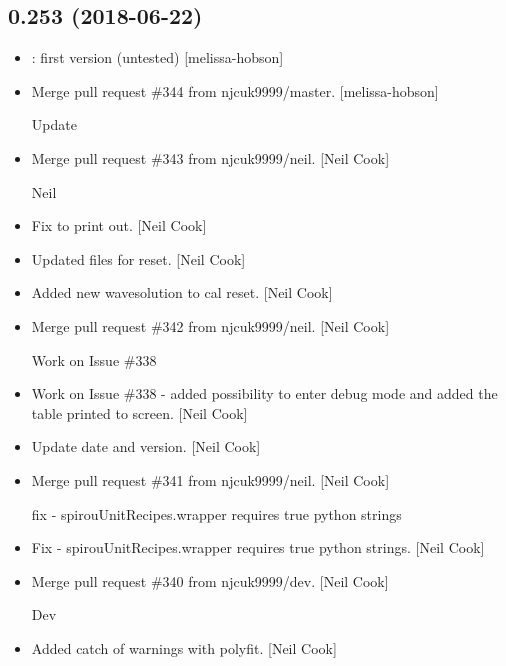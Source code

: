 \documentclass[a4paper,10pt,english]{report}
\begin{document}
\subsection{0.253 (2018-06-22)}
\label{\detokenize{misc/changelog:id413}}\begin{itemize}
\item {} 
: first version (untested) {[}melissa-hobson{]}

\item {} 
Merge pull request \#344 from njcuk9999/master. {[}melissa-hobson{]}

Update

\item {} 
Merge pull request \#343 from njcuk9999/neil. {[}Neil Cook{]}

Neil

\item {} 
Fix to print out. {[}Neil Cook{]}

\item {} 
Updated files for reset. {[}Neil Cook{]}

\item {} 
Added new wavesolution to cal reset. {[}Neil Cook{]}

\item {} 
Merge pull request \#342 from njcuk9999/neil. {[}Neil Cook{]}

Work on Issue \#338

\item {} 
Work on Issue \#338 - added possibility to enter debug mode and added
the table printed to screen. {[}Neil Cook{]}

\item {} 
Update date and version. {[}Neil Cook{]}

\item {} 
Merge pull request \#341 from njcuk9999/neil. {[}Neil Cook{]}

fix - spirouUnitRecipes.wrapper requires true python strings

\item {} 
Fix - spirouUnitRecipes.wrapper requires true python strings. {[}Neil
Cook{]}

\item {} 
Merge pull request \#340 from njcuk9999/dev. {[}Neil Cook{]}

Dev

\item {} 
Added catch of warnings with polyfit. {[}Neil Cook{]}


\end{itemize}
\end{document}
